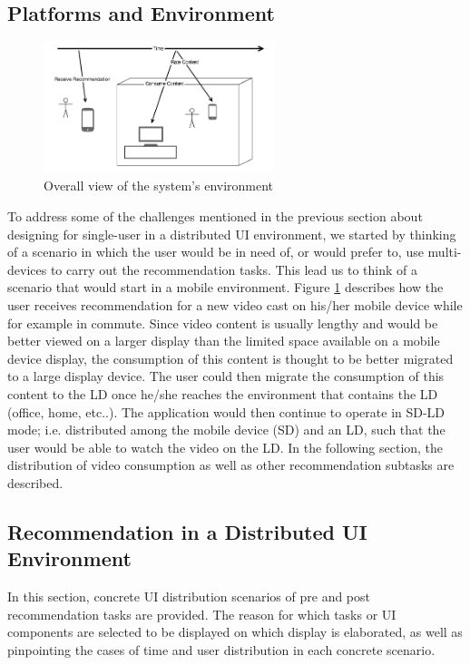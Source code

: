 \subsection{Platforms and Environment}
\begin{figure}[h!]
\includegraphics[width=0.6\textwidth, center, center]{figures/env}
\caption{Overall view of the system's environment}
\label{fig:figure311}
\end{figure}
To address some of the challenges mentioned in the previous section about designing for single-user in a distributed UI environment, we started by thinking of a scenario in which the user would be in need of, or would prefer to, use multi-devices to carry out the recommendation tasks. This lead us to think of a scenario that would start in a mobile environment. Figure \ref{fig:figure311} describes how the user receives recommendation for a new video cast on his/her mobile device while for example in commute. Since video content is usually lengthy and would be better viewed on a larger display than the limited space available on a mobile device display, the consumption of this content is thought to be better migrated to a large display device. The user could then migrate the consumption of this content to the LD once he/she reaches the environment that contains the LD (office, home, etc..). The application would then continue to operate in SD-LD mode; i.e. distributed among the mobile device (SD) and an LD, such that the user would be able to watch the video on the LD. In the following section, the distribution of video consumption as well as other recommendation subtasks are described. 
         
\subsection{Recommendation in a Distributed UI Environment}
In this section, concrete UI distribution scenarios of pre and post recommendation tasks are provided. The reason for which tasks or UI components are selected to be displayed on which display is elaborated, as well as pinpointing the cases of time and user distribution in each concrete scenario.

